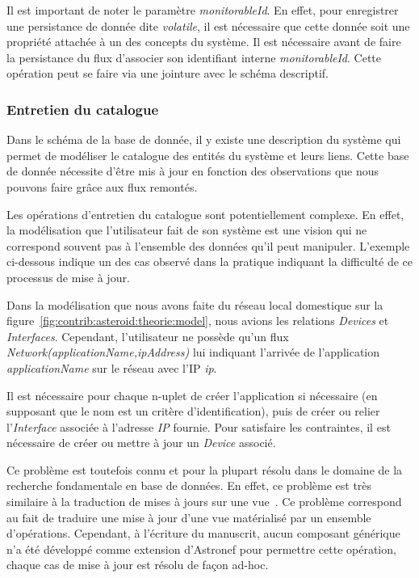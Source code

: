 Il est important de noter le paramètre \textit{monitorableId}. En effet, pour enregistrer une persistance de donnée dite \textit{volatile}, il est nécessaire que cette donnée soit une propriété attachée à un des concepts du système. Il est nécessaire avant de faire la persistance du flux d'associer son identifiant interne \textit{monitorableId}. Cette opération peut se faire via une jointure avec le schéma descriptif.

\subsubsection{Entretien du catalogue}
Dans le schéma de la base de donnée, il y existe une description du système qui permet de modéliser le catalogue des entités du système et leurs liens. Cette base de donnée nécessite d'être mis à jour en fonction des observations que nous pouvons faire grâce aux flux remontés.

Les opérations d'entretien du catalogue sont potentiellement complexe. En effet, la modélisation que l'utilisateur fait de son système est une vision qui ne correspond souvent pas à l'ensemble des données qu'il peut manipuler. L'exemple ci-dessous indique un des cas observé dans la pratique indiquant la difficulté de ce processus de mise à jour.

\begin{example}
Dans la modélisation que nous avons faite du réseau local domestique sur la figure~\ref{fig:contrib:asteroid:theorie:model}, nous avions les relations \textit{Devices} et \textit{Interfaces}. Cependant, l'utilisateur ne possède qu'un flux \textit{Network(applicationName,ipAddress)} lui indiquant l'arrivée de l'application \textit{applicationName} sur le réseau avec l'IP \textit{ip}.

Il est nécessaire pour chaque n-uplet de créer l'application si nécessaire (en supposant que le nom est un critère d'identification), puis de créer ou relier l'\textit{Interface} associée à l'adresse \textit{IP} fournie. Pour satisfaire les contraintes, il est nécessaire de créer ou mettre à jour un \textit{Device} associé.
\end{example}

Ce problème est toutefois connu et pour la plupart résolu dans le domaine de la recherche fondamentale en base de données. En effet, ce problème est très similaire à  la traduction de mises à jours sur une vue~\cite{Keller:viewupdate}. Ce problème correspond au fait de traduire une mise à jour d'une vue matérialisé par un ensemble d'opérations. Cependant, à l'écriture du manuscrit, aucun composant générique n'a été développé comme extension d'Astronef pour permettre cette opération, chaque cas de mise à jour est résolu de façon ad-hoc.
